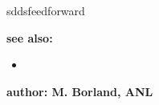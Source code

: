 \begin{sddsprog}{sddsfeedforward}
\item {\bf see also:}
    \begin{itemize}
%
%
    \item {}
    \end{itemize}
%
%
\item {\bf author: M. Borland, ANL}
\end{sddsprog}
